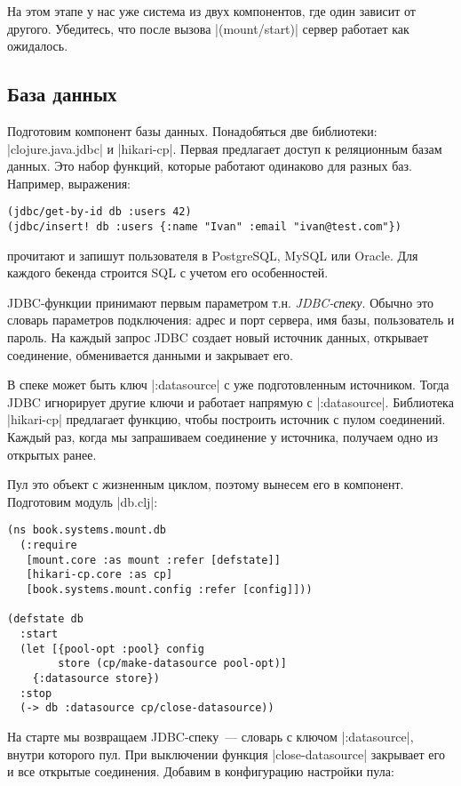 На этом этапе у нас уже система из двух компонентов, где один зависит от
другого. Убедитесь, что после вызова \spverb|(mount/start)| сервер работает как
ожидалось.

\subsection{База данных}

Подготовим компонент базы данных. Понадобяться две библиотеки:
\spverb|clojure.java.jdbc| и \spverb|hikari-cp|. Первая предлагает доступ к
реляционным базам данных. Это набор функций, которые работают одинаково для
разных баз. Например, выражения:

\begin{verbatim}
(jdbc/get-by-id db :users 42)
(jdbc/insert! db :users {:name "Ivan" :email "ivan@test.com"})
\end{verbatim}

\noindent
прочитают и запишут пользователя в PostgreSQL, MySQL или Oracle. Для каждого
бекенда строится SQL с учетом его особенностей.

JDBC-функции принимают первым параметром т.н. \emph{JDBC-спеку}. Обычно это
словарь параметров подключения: адрес и порт сервера, имя базы, пользователь и
пароль. На каждый запрос JDBC создает новый источник данных, открывает
соединение, обменивается данными и закрывает его.

В спеке может быть ключ \spverb|:datasource| с уже подготовленным
источником. Тогда JDBC игнорирует другие ключи и работает напрямую с
\spverb|:datasource|. Библиотека \spverb|hikari-cp| предлагает функцию, чтобы
построить источник с пулом соединений. Каждый раз, когда мы запрашиваем
соединение у источника, получаем одно из открытых ранее.


Пул это объект с жизненным циклом, поэтому вынесем его в компонент. Подготовим
модуль \spverb|db.clj|:

\begin{verbatim}
(ns book.systems.mount.db
  (:require
   [mount.core :as mount :refer [defstate]]
   [hikari-cp.core :as cp]
   [book.systems.mount.config :refer [config]]))

(defstate db
  :start
  (let [{pool-opt :pool} config
        store (cp/make-datasource pool-opt)]
    {:datasource store})
  :stop
  (-> db :datasource cp/close-datasource))
\end{verbatim}

На старте мы возвращаем JDBC-спеку~--- словарь с ключом \spverb|:datasource|,
внутри которого пул. При выключении функция \spverb|close-datasource| закрывает
его и все открытые соединения. Добавим в конфигурацию настройки пула:

